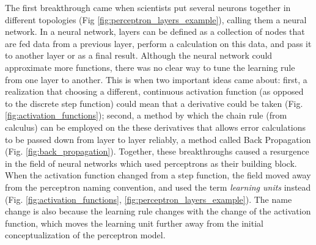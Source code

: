The first breakthrough came when scientists put several neurons together in different topologies (Fig \ref{fig:perceptron_layers_example}), calling them a neural network. In a neural network, layers can be defined as a collection of nodes that are fed data from a previous layer, perform a calculation on this data, and pass it to another layer or as a final result.  Although the neural network could approximate more functions, there was no clear way to tune the learning rule from one layer to another. This is when two important ideas came about: first, a realization that choosing a different, continuous activation function (as opposed to the discrete step function) could mean that a derivative could be taken (Fig. \ref{fig:activation_functions}); second, a method by which the chain rule (from calculus) can be employed on the these derivatives that allows error calculations to be passed down from layer to layer reliably, a method called Back Propagation (Fig. \ref{fig:back_propagation}). Together, these breakthroughs caused a resurgence in the field of neural networks which used perceptrons as their building block. When the activation function changed from a step function, the field moved away from the perceptron naming convention, and used the term \textit{learning units} instead (Fig. \ref{fig:activation_functions}, \ref{fig:perceptron_layers_example}). The name change is also because the learning rule changes with the change of the activation function, which moves the learning unit further away from the initial conceptualization of the perceptron model.


